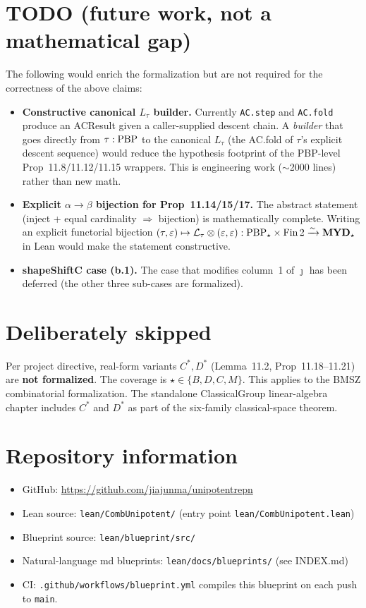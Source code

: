 \section{TODO (future work, not a mathematical gap)}
\label{sec:status_todo}

The following would enrich the formalization but are not required for the
correctness of the above claims:

\begin{itemize}
  \item \textbf{Constructive canonical \(L_\tau\) builder.} Currently
    \texttt{AC.step} and \texttt{AC.fold} produce an ACResult given a caller-supplied
    descent chain. A \emph{builder} that goes directly from \(\tau : \mathrm{PBP}\) to the
    canonical \(L_\tau\) (the AC.fold of \(\tau\)'s explicit descent sequence)
    would reduce the hypothesis footprint of the PBP-level Prop~11.8/11.12/11.15
    wrappers. This is engineering work ($\sim$2000 lines) rather than new math.
  \item \textbf{Explicit \(\alpha \to \beta\) bijection for Prop~11.14/15/17.}
    The abstract statement (inject + equal cardinality $\Rightarrow$ bijection)
    is mathematically complete. Writing an explicit functorial bijection
    $(\tau, \varepsilon) \mapsto \mathcal{L}_\tau \otimes (\varepsilon, \varepsilon) : \mathrm{PBP}_\star \times \mathrm{Fin}\,2 \xrightarrow{\sim} \mathbf{MYD}_\star$
    in Lean would make the statement constructive.
  \item \textbf{shapeShiftC case (b.1).} The case that modifies column~1 of
    $\jmath$ has been deferred (the other three sub-cases are formalized).
\end{itemize}

\section{Deliberately skipped}

Per project directive, real-form variants $C^*, D^*$ (Lemma~11.2, Prop~11.18--11.21)
are \textbf{not formalized}. The coverage is $\star \in \{B, D, C, M\}$.
This applies to the BMSZ combinatorial formalization.  The standalone
ClassicalGroup linear-algebra chapter includes $C^*$ and $D^*$ as part of the
six-family classical-space theorem.

\section{Repository information}

\begin{itemize}
  \item GitHub: \url{https://github.com/jiajunma/unipotentrepn}
  \item Lean source: \texttt{lean/CombUnipotent/} (entry point \texttt{lean/CombUnipotent.lean})
  \item Blueprint source: \texttt{lean/blueprint/src/}
  \item Natural-language md blueprints: \texttt{lean/docs/blueprints/} (see INDEX.md)
  \item CI: \texttt{.github/workflows/blueprint.yml} compiles this blueprint on each push to \texttt{main}.
\end{itemize}

